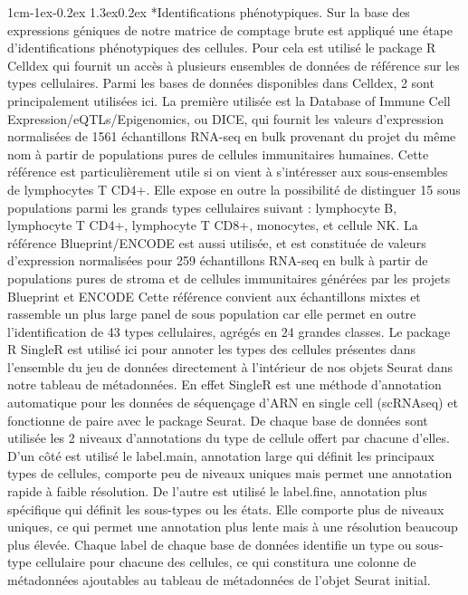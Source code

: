 \documentclass[12pt]{report}
\makeatletter
\renewcommand\subsubsection{\@startsection{subsubsection}{3}{\z@}%
	{1cm\@plus -1ex\@minus -0.2ex}%
	{1.3ex\@plus 0.2ex}%
	{\reset@font\normalsize\bf}}
\makeatother
\begin{document}
\subsubsection*{Identifications phénotypiques.}
Sur la base des expressions géniques de notre matrice de comptage brute est appliqué une étape d'identifications phénotypiques des cellules. 
Pour cela est utilisé le package R Celldex\cite{celldex} qui fournit un accès à plusieurs ensembles de données de référence sur les types cellulaires. 
Parmi les bases de données disponibles dans Celldex, 2 sont principalement utilisées ici.
La première utilisée est la Database of Immune Cell Expression/eQTLs/Epigenomics, ou DICE\cite{Schmiedel}, qui fournit les valeurs d'expression normalisées de 1561 échantillons RNA-seq en bulk provenant 
du projet du même nom à partir de populations pures de cellules immunitaires humaines.
Cette référence est particulièrement utile si on vient à s'intéresser aux sous-ensembles de lymphocytes T CD4+. 
Elle expose en outre la possibilité de distinguer 15 sous populations parmi les grands types cellulaires suivant : lymphocyte B, lymphocyte T CD4+, lymphocyte T CD8+, monocytes, et cellule NK.
La référence Blueprint/ENCODE est aussi utilisée, et est constituée de valeurs d'expression normalisées pour 259 échantillons RNA-seq en bulk à partir de populations pures de stroma et 
de cellules immunitaires générées par les projets Blueprint\cite{Blueprint} et ENCODE\cite{ENCODEProject}
Cette référence convient aux échantillons mixtes et rassemble un plus large panel de sous population car elle permet en outre l'identification de 43 types cellulaires, agrégés en 24 grandes classes.
Le package R SingleR\cite{celldex} est utilisé ici pour annoter les types des cellules présentes dans l'ensemble du jeu de données directement à l'intérieur de nos objets Seurat dans notre tableau de métadonnées.
En effet SingleR est une méthode d'annotation automatique pour les données de séquençage d'ARN en single cell (scRNAseq) et fonctionne de paire avec le package Seurat. De chaque base de données sont utilisée 
les 2 niveaux d'annotations du type de cellule offert par chacune d'elles.
D'un côté est utilisé le label.main, annotation large qui définit les principaux types de cellules, comporte peu de niveaux uniques mais permet une annotation rapide à faible résolution.
De l'autre est utilisé le label.fine, annotation plus spécifique qui définit les sous-types ou les états. Elle comporte plus de niveaux uniques, ce qui permet une annotation plus lente mais à une résolution beaucoup plus élevée.
Chaque label de chaque base de données identifie un type ou sous-type cellulaire pour chacune des cellules, ce qui constitura une colonne de métadonnées ajoutables au tableau de métadonnées de l'objet Seurat initial.
\end{document}
